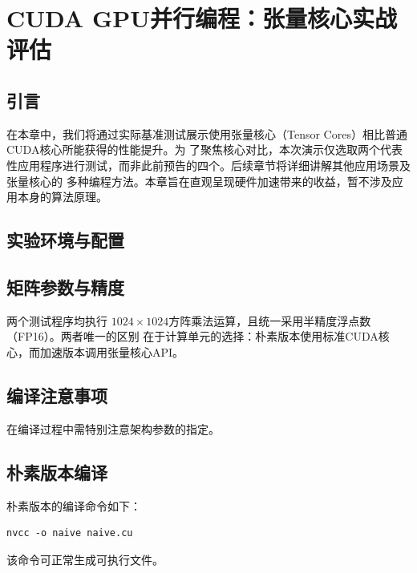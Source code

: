 \section{CUDA GPU并行编程：张量核心实战评估}


\subsection{引言}
在本章中，我们将通过实际基准测试展示使用张量核心（Tensor Cores）相比普通CUDA核心所能获得的性能提升。为
了聚焦核心对比，本次演示仅选取两个代表性应用程序进行测试，而非此前预告的四个。后续章节将详细讲解其他应用场景及张量核心的
多种编程方法。本章旨在直观呈现硬件加速带来的收益，暂不涉及应用本身的算法原理。

\subsection{实验环境与配置}
\subsection{矩阵参数与精度}
两个测试程序均执行 $1024 \times 1024$方阵乘法运算，且统一采用半精度浮点数（FP16）。两者唯一的区别
在于计算单元的选择：朴素版本使用标准CUDA核心，而加速版本调用张量核心API。

\subsection{编译注意事项}
在编译过程中需特别注意架构参数的指定。

\subsection{朴素版本编译}
朴素版本的编译命令如下：
\begin{lstlisting}
nvcc -o naive naive.cu
\end{lstlisting}
该命令可正常生成可执行文件。

